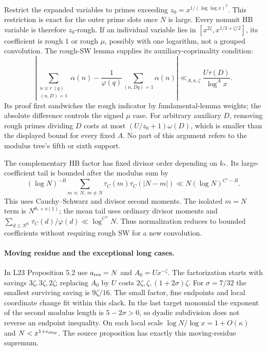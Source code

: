 Restrict the expanded variables to primes exceeding
$z_0=x^{1/(\log\log x)^3}$. This restriction is exact for the outer
prime slots once $N$ is large. Every nonunit HB variable is therefore
$z_0$-rough. If an individual variable lies in
$[x^{2\zeta},x^{1/3+\zeta/2}]$, its coefficient is rough $1$ or
rough $\mu$, possibly with one logarithm, not a grouped convolution.
The rough-SW lemma supplies its auxiliary-coprimality condition:
\[
 \left|\sum_{\substack{n\equiv r\ (q)\\(n,D)=1}}\alpha(n)
 -\frac1{\varphi(q)}\sum_{(n,Dq)=1}\alpha(n)\right|
 \ll_{A,a,\zeta}\frac{U\tau(D)}{\log^A x}.
\]
Its proof first sandwiches the rough indicator by fundamental-lemma
weights; the absolute difference controls the signed $\mu$ case.
For arbitrary auxiliary $D$, removing rough primes dividing $D$ costs
at most $(U/z_0+1)\omega(D)$, which is smaller than the displayed
bound for every fixed $A$. No part of this argument refers to the
modulus tree's fifth or sixth support.

The complementary HB factor has fixed divisor order depending on
$k_*$. Its large-coefficient tail is bounded after the modulus sum by
\[
 (\log N)^{-B}\sum_{m\ll N,\ m\ne N}
       \tau_C(m)\tau_C(|N-m|)
 \ll N(\log N)^{C'-B}.
\]
This uses Cauchy--Schwarz and divisor second moments. The isolated
$m=N$ term is $N^{\theta_*+o(1)}$; the mean tail uses ordinary divisor
moments and $\sum_{d\le N^{\theta_*}}\tau_C(d)/\varphi(d)
\ll\log^{C''}N$. Thus normalization reduces to bounded coefficients
without requiring rough SW for a new convolution.

\paragraph{Moving residue and the exceptional long cases.}
In L23 Proposition 5.2 use $a_{\rm res}=N$ and $A_0=Ux^{-\zeta}$.
The factorization starts with savings $3\zeta,3\zeta,2\zeta$;
replacing $A_0$ by $U$ costs $2\zeta,\zeta,(1+2\sigma)\zeta$.
For $\sigma=7/32$ the smallest surviving saving is $9\zeta/16$.
The small factor, fine endpoints and local coordinate change fit
within this slack. In the last target monomial the exponent of the
second modulus length is $5-2\sigma>0$, so dyadic subdivision does
not reverse an endpoint inequality. On each local scale
$\log N/\log x=1+O(\kappa)$ and $N<x^{1+\epsilon_{\rm disp}}$.
The source proposition has exactly this moving-residue supremum.

